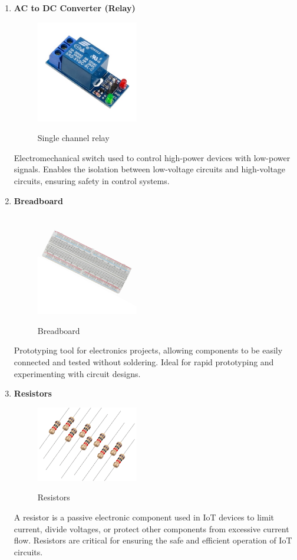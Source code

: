 {\begin{enumerate}
    \item \textbf{AC to DC Converter (Relay)}\\
    \begin{figure}[H]
            \centering
            \includegraphics[width=1.75in]{relay.jpg} \\
            \caption{Single channel relay}
            \label{fig:relay} 
        \end{figure}
    Electromechanical switch used to control high-power devices with low-power signals. Enables the isolation between low-voltage circuits and high-voltage circuits, ensuring safety in control systems.
    
    \item \textbf{Breadboard}\\
    \begin{figure}[H]
            \centering
            \includegraphics[width=1.75in]{breadboard.jpg} \\
            \caption{Breadboard}
            \label{fig:breadboard} 
        \end{figure}
    Prototyping tool for electronics projects, allowing components to be easily connected and tested without soldering. Ideal for rapid prototyping and experimenting with circuit designs.
    
    \item \textbf{Resistors}\\
    \begin{figure}[H]
            \centering
            \includegraphics[width=1.75in]{resistors.png} \\
            \caption{Resistors}
            \label{fig:resistors} 
        \end{figure}
    A resistor is a passive electronic component used in IoT devices to limit current, divide voltages, or protect other components from excessive current flow. Resistors are critical for ensuring the safe and efficient operation of IoT circuits.
    

\end{enumerate}}
